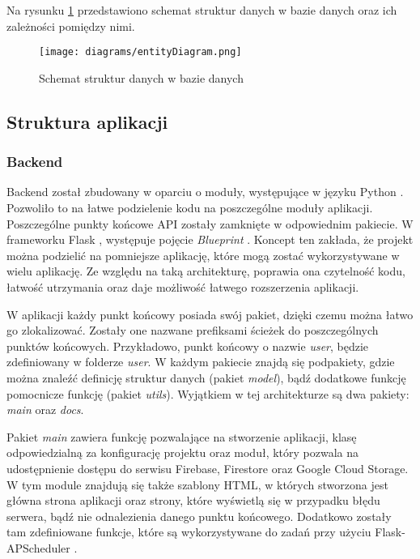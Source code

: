 Na rysunku \ref{database} przedstawiono schemat struktur danych w bazie danych oraz ich zależności pomiędzy nimi.

\begin{figure}[H]
    \centering
    \texttt{[image: diagrams/entityDiagram.png]}
    \caption{Schemat struktur danych w bazie danych}
    \label{database}
\end{figure}

\subsection{Struktura aplikacji}
\subsubsection{Backend}
Backend został zbudowany w oparciu o moduły, występujące w języku Python \cite{python}. Pozwoliło to na łatwe podzielenie kodu na poszczególne moduły aplikacji. Poszczególne punkty końcowe API zostały zamknięte w odpowiednim pakiecie. W frameworku Flask \cite{flask}, występuje pojęcie \textit{Blueprint} \cite{flask_blueprint}. Koncept ten zakłada, że projekt można podzielić na pomniejsze aplikację, które mogą zostać wykorzystywane w wielu aplikację. Ze względu na taką architekturę, poprawia ona czytelność kodu, łatwość utrzymania oraz daje możliwość łatwego rozszerzenia aplikacji.

W aplikacji każdy punkt końcowy posiada swój pakiet, dzięki czemu można łatwo go zlokalizować. Zostały one nazwane prefiksami ścieżek do poszczególnych punktów końcowych. Przykładowo, punkt końcowy o nazwie \textit{user}, będzie zdefiniowany w folderze \textit{user}. W każdym pakiecie znajdą się podpakiety, gdzie można znaleźć definicję struktur danych (pakiet \textit{model}), bądź dodatkowe funkcję pomocnicze funkcję (pakiet \textit{utils}). Wyjątkiem w tej architekturze są dwa pakiety: \textit{main} oraz \textit{docs}.

Pakiet \textit{main} zawiera funkcję pozwalające na stworzenie aplikacji, klasę odpowiedzialną za konfigurację projektu oraz moduł, który pozwala na udostępnienie dostępu do serwisu Firebase, Firestore oraz Google Cloud Storage. W tym module znajdują się także szablony HTML, w których stworzona jest główna strona aplikacji oraz strony, które wyświetlą się w przypadku błędu serwera, bądź nie odnalezienia danego punktu końcowego. Dodatkowo zostały tam zdefiniowane funkcje, które są wykorzystywane do zadań przy użyciu Flask-APScheduler \cite{flask_apscheduler}.

